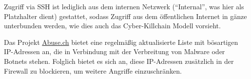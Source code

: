 Zugriff via \ac{SSH} ist lediglich aus dem internen Netzwerk (\enquote{Internal}, was hier als Platzhalter dient) gestattet, sodass Zugriff aus dem öffentlichen Internet in gänze unterbunden werden, wie dies auch das Cyber-Killchain Modell vorsieht.

Das Projekt \href{https://abuse.ch}{Abuse.ch} bietet eine regelmäßig aktualisierte Liste mit bösartigen IP-Adressen an, die in Verbindung mit der Verbreitung von Malware oder Botnets stehen. Folglich bietet es sich an, diese IP-Adressen zusätzlich in der Firewall zu blockieren, um weitere Angriffe einzuschränken.